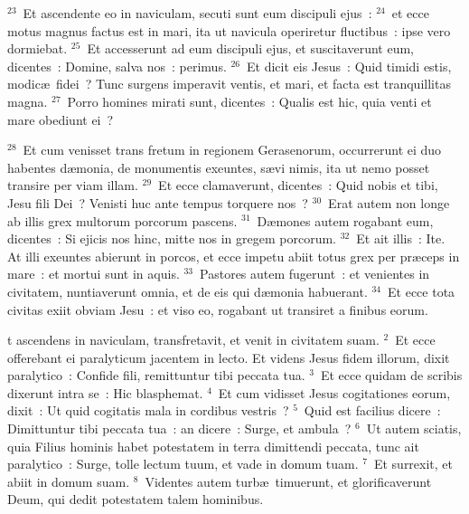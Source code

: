 ${}^{23}$~Et ascendente eo in naviculam, secuti sunt eum discipuli ejus~:
${}^{24}$~et ecce motus magnus factus est in mari, ita ut navicula operiretur fluctibus~: ipse vero dormiebat.
${}^{25}$~Et accesserunt ad eum discipuli ejus, et suscitaverunt eum, dicentes~: Domine, salva nos~: perimus.
${}^{26}$~Et dicit eis Jesus~: Quid timidi estis, modic\ae\ fidei~? Tunc surgens imperavit ventis, et mari, et facta est tranquillitas magna.
${}^{27}$~Porro homines mirati sunt, dicentes~: Qualis est hic, quia venti et mare obediunt ei~?


${}^{28}$~Et cum venisset trans fretum in regionem Gerasenorum, occurrerunt ei duo habentes d\ae monia, de monumentis exeuntes, s\ae vi nimis, ita ut nemo posset transire per viam illam.
${}^{29}$~Et ecce clamaverunt, dicentes~: Quid nobis et tibi, Jesu fili Dei~? Venisti huc ante tempus torquere nos~?
${}^{30}$~Erat autem non longe ab illis grex multorum porcorum pascens.
${}^{31}$~D\ae mones autem rogabant eum, dicentes~: Si ejicis nos hinc, mitte nos in gregem porcorum.
${}^{32}$~Et ait illis~: Ite. At illi exeuntes abierunt in porcos, et ecce impetu abiit totus grex per pr\ae ceps in mare~: et mortui sunt in aquis.
${}^{33}$~Pastores autem fugerunt~: et venientes in civitatem, nuntiaverunt omnia, et de eis qui d\ae monia habuerant.
${}^{34}$~Et ecce tota civitas exiit obviam Jesu~: et viso eo, rogabant ut transiret a finibus eorum.

\bchapter
{}t ascendens in naviculam, transfretavit, et venit in civitatem suam.
${}^{2}$~Et ecce offerebant ei paralyticum jacentem in lecto. Et videns Jesus fidem illorum, dixit paralytico~: Confide fili, remittuntur tibi peccata tua.
${}^{3}$~Et ecce quidam de scribis dixerunt intra se~: Hic blasphemat.
${}^{4}$~Et cum vidisset Jesus cogitationes eorum, dixit~: Ut quid cogitatis mala in cordibus vestris~?
${}^{5}$~Quid est facilius dicere~: Dimittuntur tibi peccata tua~: an dicere~: Surge, et ambula~?
${}^{6}$~Ut autem sciatis, quia Filius hominis habet potestatem in terra dimittendi peccata, tunc ait paralytico~: Surge, tolle lectum tuum, et vade in domum tuam.
${}^{7}$~Et surrexit, et abiit in domum suam.
${}^{8}$~Videntes autem turb\ae\ timuerunt, et glorificaverunt Deum, qui dedit potestatem talem hominibus.



